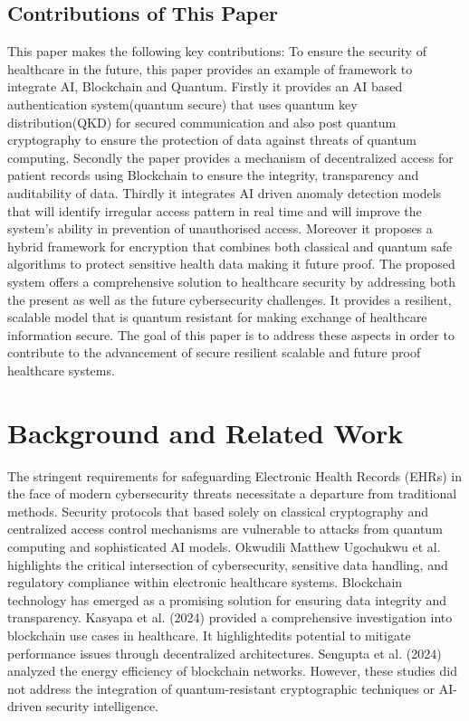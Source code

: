 \documentclass[pdflatex,sn-mathphys-num]{sn-jnl}
\theoremstyle{thmstyleone}%
\theoremstyle{thmstyletwo}%
\theoremstyle{thmstylethree}%
\begin{document}
\subsection{Contributions of This Paper}
This paper makes the following key contributions:
To ensure the security of healthcare in the future, this paper provides an example of framework to integrate AI, Blockchain and Quantum. Firstly it provides an AI based  authentication system(quantum secure) that uses quantum key distribution(QKD) for secured communication and also post quantum cryptography to ensure the protection of data against threats of quantum computing. Secondly the paper provides a mechanism of decentralized access for patient records using Blockchain to ensure the integrity, transparency and auditability of data. Thirdly it integrates AI driven anomaly detection models that will identify irregular access pattern in real time and will improve the system's ability in prevention of unauthorised access. Moreover it proposes a hybrid framework for encryption that combines both classical and quantum safe algorithms to protect sensitive health data making it future proof. The proposed system offers a comprehensive solution to healthcare security by addressing both the present as well as the future cybersecurity challenges. It provides a resilient, scalable model that is quantum resistant for making exchange of healthcare information secure.
The goal of this paper is to address these aspects in order to contribute to the advancement of secure resilient scalable and future proof healthcare systems.


\section{Background and Related Work}

The stringent requirements for safeguarding Electronic Health Records (EHRs) in the face of modern cybersecurity threats necessitate a departure from traditional methods. Security protocols that based solely on classical cryptography and centralized access control mechanisms are vulnerable to attacks from quantum computing and sophisticated AI models. Okwudili Matthew Ugochukwu et al. \cite{bib4} highlights the critical intersection of cybersecurity, sensitive data handling, and regulatory compliance within electronic healthcare systems. 
Blockchain technology has emerged as a promising solution for ensuring data integrity and transparency. Kasyapa et al. (2024) \cite{bib8} provided a comprehensive investigation into blockchain use cases in healthcare. It highlightedits potential to mitigate performance issues through decentralized architectures. Sengupta et al. (2024) \cite{bib7} analyzed the energy efficiency of blockchain networks. However, these studies did not address the integration of quantum-resistant cryptographic techniques or AI-driven security intelligence.
\end{document}
